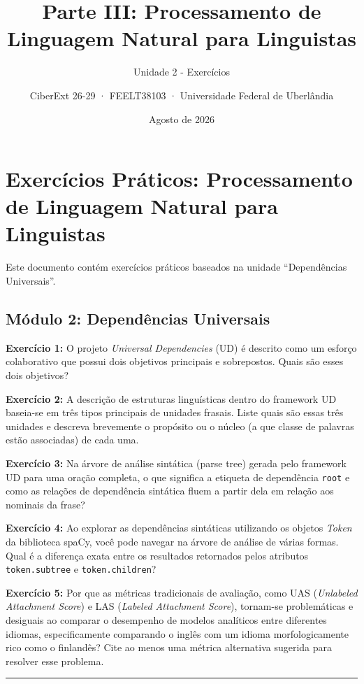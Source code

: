 \documentclass[
  brazilian,
]{article}
\title{Parte III: Processamento de Linguagem Natural para Linguistas}
\subtitle{Unidade 2 - Exercícios}
\author{CiberExt 26-29 · FEELT38103 · Universidade Federal de
Uberlândia}
\date{Agosto de 2026}
\begin{document}
\maketitle

\hypertarget{exercuxedcios-pruxe1ticos-processamento-de-linguagem-natural-para-linguistas}{%
\section{Exercícios Práticos: Processamento de Linguagem Natural para
Linguistas}\label{exercuxedcios-pruxe1ticos-processamento-de-linguagem-natural-para-linguistas}}

Este documento contém exercícios práticos baseados na unidade
``Dependências Universais''.

\hypertarget{muxf3dulo-2-dependuxeancias-universais}{%
\subsection{Módulo 2: Dependências
Universais}\label{muxf3dulo-2-dependuxeancias-universais}}

\textbf{Exercício 1:} O projeto \emph{Universal Dependencies} (UD) é
descrito como um esforço colaborativo que possui dois objetivos
principais e sobrepostos. Quais são esses dois objetivos?

\textbf{Exercício 2:} A descrição de estruturas linguísticas dentro do
framework UD baseia-se em três tipos principais de unidades frasais.
Liste quais são essas três unidades e descreva brevemente o propósito ou
o núcleo (a que classe de palavras estão associadas) de cada uma.

\textbf{Exercício 3:} Na árvore de análise sintática (parse tree) gerada
pelo framework UD para uma oração completa, o que significa a etiqueta
de dependência \texttt{root} e como as relações de dependência sintática
fluem a partir dela em relação aos nominais da frase?

\textbf{Exercício 4:} Ao explorar as dependências sintáticas utilizando
os objetos \emph{Token} da biblioteca spaCy, você pode navegar na árvore
de análise de várias formas. Qual é a diferença exata entre os
resultados retornados pelos atributos \texttt{token.subtree} e
\texttt{token.children}?

\textbf{Exercício 5:} Por que as métricas tradicionais de avaliação,
como UAS (\emph{Unlabeled Attachment Score}) e LAS (\emph{Labeled
Attachment Score}), tornam-se problemáticas e desiguais ao comparar o
desempenho de modelos analíticos entre diferentes idiomas,
especificamente comparando o inglês com um idioma morfologicamente rico
como o finlandês? Cite ao menos uma métrica alternativa sugerida para
resolver esse problema.

\begin{center}\rule{0.5\linewidth}{0.5pt}\end{center}
\end{document}
